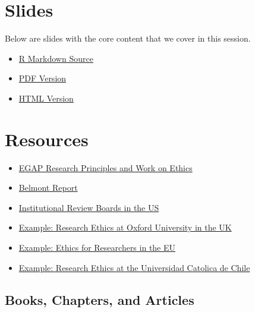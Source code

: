 \documentclass[12pt,]{book}
\begin{document}
\hypertarget{slides-8}{%
\section{Slides}\label{slides-8}}

Below are slides with the core content that we cover in this session.

\begin{itemize}
\item
  \href{https://egap.github.io/learningdays-resources/Slides/ethics-slides.Rmd}{R Markdown Source}
\item
  \href{https://egap.github.io/learningdays-resources/Slides/ethics-slides.pdf}{PDF Version}
\item
  \href{https://egap.github.io/learningdays-resources/Slides/ethics-slides.html}{HTML Version}
\end{itemize}

\hypertarget{resources-8}{%
\section{Resources}\label{resources-8}}

\begin{itemize}
\item
  \href{https://egap.org/ethics/}{EGAP Research Principles and Work on Ethics}
\item
  \href{https://www.hhs.gov/ohrp/regulations-and-policy/belmont-report/index.html}{Belmont Report}
\item
  \href{https://www.youtube.com/watch?v=U8fme1boEbE}{Institutional Review Boards in the US}
\item
  \href{https://researchsupport.admin.ox.ac.uk/governance/ethics}{Example: Research Ethics at Oxford University in the UK}
\item
  \href{https://ec.europa.eu/research/participants/data/ref/fp7/89888/ethics-for-researchers_en.pdf}{Example: Ethics for Researchers in the EU}
\item
  \href{http://eticayseguridad.uc.cl/}{Example: Research Ethics at the Universidad Catolica de Chile}
\end{itemize}

\hypertarget{books-chapters-and-articles-6}{%
\subsection{Books, Chapters, and Articles}\label{books-chapters-and-articles-6}}
\end{document}
